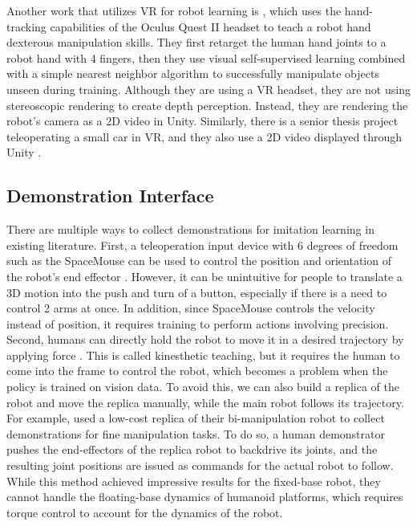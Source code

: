 Another work that utilizes VR for robot learning is \cite{arunachalam2022holodex}, which uses the hand-tracking capabilities of the Oculus Quest II headset to teach a robot hand dexterous manipulation skills. They first retarget the human hand joints to a robot hand with 4 fingers, then they use visual self-supervised learning combined with a simple nearest neighbor algorithm to successfully manipulate objects unseen during training. Although they are using a VR headset, they are not using stereoscopic rendering to create depth perception. Instead, they are rendering the robot's camera as a 2D video in Unity. Similarly, there is a senior thesis project teleoperating a small car in VR, and they also use a 2D video displayed through Unity \cite{carvr}. 

\subsection{Demonstration Interface}

There are multiple ways to collect demonstrations for imitation learning in existing literature. First, a teleoperation input device with 6 degrees of freedom such as the SpaceMouse can be used to control the position and orientation of the robot's end effector \cite{zhu2022robosuite}. However, it can be unintuitive for people to translate a 3D motion into the push and turn of a button, especially if there is a need to control 2 arms at once. In addition, since SpaceMouse controls the velocity instead of position, it requires training to perform actions involving precision. 
Second, humans can directly hold the robot to move it in a desired trajectory by applying force \cite{Akgn2012KeyframebasedLF} \cite{Schulman2013LearningFD}. This is called kinesthetic teaching, but it requires the human to come into the frame to control the robot, which becomes a problem when the policy is trained on vision data. To avoid this, we can also build a replica of the robot and move the replica manually, while the main robot follows its trajectory. For example, \cite{aloha} used a low-cost replica of their bi-manipulation robot to collect demonstrations for fine manipulation tasks. To do so, a human demonstrator pushes the end-effectors of the replica robot to backdrive its joints, and the resulting joint positions are issued as commands for the actual robot to follow. While this method achieved impressive results for the fixed-base robot, they cannot handle the floating-base dynamics of humanoid platforms, which requires torque control to account for the dynamics of the robot. 

